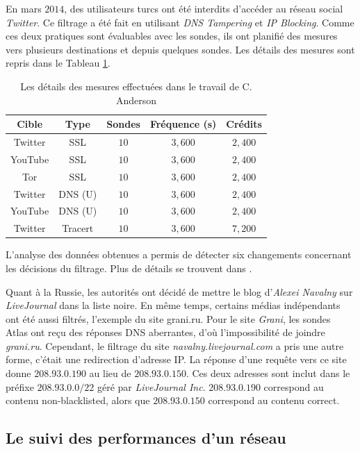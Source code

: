 En mars $2014$, des utilisateurs turcs ont été interdits d'accéder au réseau social  \textit{Twitter}.  Ce filtrage a été fait en utilisant \textit{DNS Tampering} et \textit{IP Blocking}. Comme ces deux pratiques sont évaluables avec les sondes, ils ont planifié des mesures vers plusieurs destinations et depuis quelques  sondes. Les détails des mesures sont  repris  dans le Tableau  \ref{ta:censorship-colin}.
\begin{table}[H]
	\centering
	\captionsetup{justification=centering}
	\begin{tabular}{ c c c c c}
		\textbf{Cible} &\textbf{Type} &	\textbf{Sondes} &\textbf{Fréquence (s)}	& \textbf{Crédits} \\ \hline
		Twitter &SSL &$ 10 $ &$ 3,600 $ &$ 2,400 $\\ \hline
		YouTube &SSL &$ 10 $ &$ 3,600 $ &$ 2,400 $ \\ \hline
		Tor & SSL &$ 10 $ &$ 3,600 $ &$ 2,400 $ \\ \hline
		Twitter & DNS (U) &$ 10 $ &$ 3,600 $ &$ 2,400 $ \\ \hline
		YouTube & DNS (U) &$ 10 $ &$ 3,600 $ &$ 2,400 $ \\ \hline
		Twitter &Tracert &$ 10 $ &$ 3,600 $ & $ 7,200 $ \\ \hline
	\end{tabular}
	\caption{Les détails des mesures effectuées dans le travail de C. Anderson \cite{Collin-Anderson} }
	\label{ta:censorship-colin}
\end{table}
L'analyse des données obtenues a permis de  détecter  six changements concernant les décisions du filtrage. Plus de détails se trouvent dans \cite{Collin-Anderson}.

Quant à la Russie, les autorités ont décidé de mettre le blog d'\textit{Alexei Navalny} sur  \textit{LiveJournal}  dans la liste noire. En même temps, certains médias indépendants ont été aussi filtrés, l'exemple du site grani.ru.  Pour le site  \textit{Grani}, les sondes Atlas ont reçu des réponses DNS aberrantes, d'où l'impossibilité de joindre   \textit{grani.ru}. Cependant, le filtrage du site \textit{navalny.livejournal.com}  a pris une autre forme, c'était une redirection d'adresse IP. La réponse d'une requête vers ce site donne $208.93.0.190$  au lieu de $ 208.93.0.150$. Ces deux adresses sont inclut dans le préfixe $208.93.0.0/22$ géré par \textit{LiveJournal Inc}. 
$208.93.0.190$  correspond au contenu  non-blacklisted, alors que  $ 208.93.0.150$ correspond au contenu correct.

\subsection{Le suivi des performances d'un réseau}
